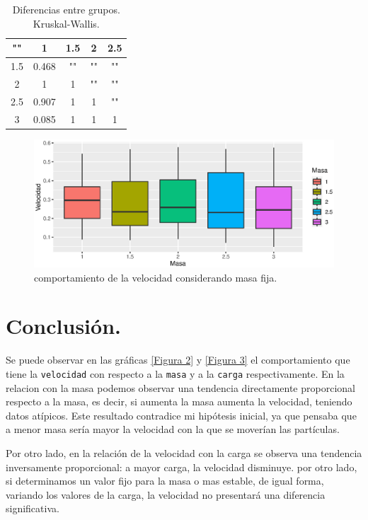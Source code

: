 \documentclass{article}
\begin{document}
\begin{table}[htb]
    \centering
    \caption{Diferencias entre grupos. Kruskal-Wallis.} 
    \begin{tabular}{|c|c|c|c|c|}
    \hline
    "" & 1 & 1.5 & 2 & 2.5  \\
    \hline
    1.5 & 0.468 & "" & "" & ""  \\
    \hline
    2 & 1 & 1  & "" & ""   \\
    \hline
    2.5 & 0.907 & 1 & 1 & ""   \\
    \hline
    3 & 0.085 & 1 & 1 & 1  \\
    \hline
\end{tabular}
    \label{cuadro 3}
\end{table}

\begin{figure}[htb] %
    \centering
    \includegraphics[width=150mm]{Rplotmasa.eps} %
    \caption{comportamiento de la velocidad considerando masa fija.}
    \label{Figura 10}
\end{figure}
\newpage


\section{Conclusi\'on.}
Se puede observar en las gr\'aficas \ref{Figura 2} y \ref{Figura 3} el comportamiento que tiene la \texttt{velocidad} con respecto a la \texttt{masa} y a la \texttt{carga} respectivamente. En la relacion con la masa podemos observar una tendencia directamente proporcional respecto a la masa, es decir, si aumenta la masa aumenta la velocidad, teniendo datos at\'ipicos. Este resultado contradice mi hip\'otesis inicial, ya que pensaba que a menor masa ser\'ia mayor la velocidad con la que se mover\'ian las part\'iculas.

Por otro lado, en la relaci\'on de la velocidad con la carga se observa una tendencia inversamente proporcional: a mayor carga, la velocidad disminuye.
por otro lado, si determinamos un valor fijo para la masa o mas estable, de igual forma, variando los valores de la carga, la velocidad no presentar\'a una diferencia significativa.



\end{document}
